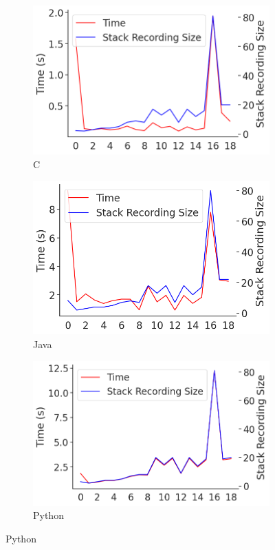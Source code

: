 \documentclass[english,submission]{programming}
\begin{document}
\begin{figure}[htbp]
  \centering
  \begin{subfigure}[b]{0.3\textwidth}
      \centering
      \includegraphics[width=\textwidth]{img/scenario_bs_c.png}
      \caption{\centering C}
      \label{subfig:scenario-bs-c}
  \end{subfigure}
  \hfill
  \begin{subfigure}[b]{0.3\textwidth}
      \centering
      \includegraphics[width=\textwidth]{img/scenario_bs_java.png}
      \caption{\centering Java}
      \label{subfig:scenario-bs-java}
  \end{subfigure}
  \hfill
  \begin{subfigure}[b]{0.3\textwidth}
    \centering
    \includegraphics[width=\textwidth]{img/scenario_bs_python.png}
    \caption{\centering Python}
    \label{subfig:scenario-bs-py}
  \end{subfigure}


\end{figure}
\end{document}
